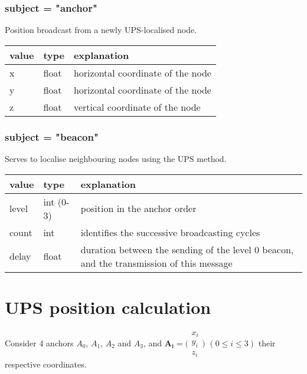 \documentclass[12pt,a4paper,fleqn]{report}
\begin{document}
\begin{appendices}
\subsection*{subject = "anchor"}

Position broadcast from a newly UPS-localised node.

\begin{tabular}{|p{2cm}|p{2cm}|p{10cm}|}
	\hline
	\textbf{value} & \textbf{type} & \textbf{explanation} \\
	\hline
	x		& float		&
	horizontal coordinate of the node \\
	\hline
	y		& float		&
	horizontal coordinate of the node \\
	\hline
	z		& float		&
	vertical coordinate of the node \\
	\hline
\end{tabular}

\subsection*{subject = "beacon"}

Serves to localise neighbouring nodes using the UPS method.

\begin{tabular}{|p{2cm}|p{2cm}|p{10cm}|}
	\hline
	\textbf{value} & \textbf{type} & \textbf{explanation} \\
	\hline
	level	& int (0-3)	&
	position in the anchor order \\
	\hline
	count	& int		&
	identifies the successive broadcasting cycles \\
	\hline
	delay	& float		&
	duration between the sending of the level 0 beacon, and the transmission of this message \\
	\hline
\end{tabular}

\chapter{UPS position calculation}
\label{appendix:tdoa}

{\parindent0pt %

Consider 4 anchors $A_0$, $A_1$, $A_2$ and $A_3$, and $\mathbf{A_i} = \bigl( \begin{smallmatrix} x_i \\ y_i \\ z_i \end{smallmatrix} \bigr)$ $(0 \leq i \leq 3)$ their respective coordinates.

}
\end{appendices}
\end{document}
